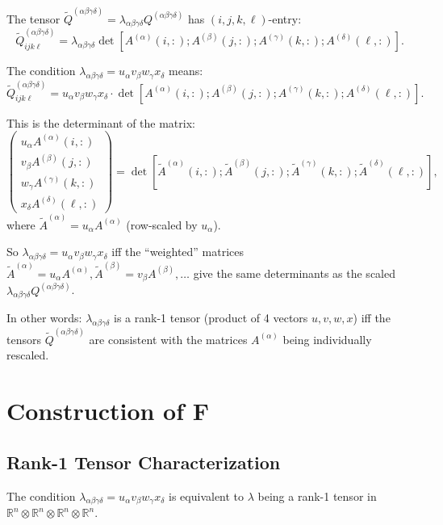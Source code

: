 \documentclass[12pt]{article}
\theoremstyle{definition}
\begin{document}
The tensor $\tilde{Q}^{(\alpha\beta\gamma\delta)} = \lambda_{\alpha\beta\gamma\delta}Q^{(\alpha\beta\gamma\delta)}$ has $(i,j,k,\ell)$-entry:
$$\tilde{Q}^{(\alpha\beta\gamma\delta)}_{ijk\ell} = \lambda_{\alpha\beta\gamma\delta}\det[A^{(\alpha)}(i,:);A^{(\beta)}(j,:);A^{(\gamma)}(k,:);A^{(\delta)}(\ell,:)].$$

The condition $\lambda_{\alpha\beta\gamma\delta} = u_\alpha v_\beta w_\gamma x_\delta$ means:
$$\tilde{Q}^{(\alpha\beta\gamma\delta)}_{ijk\ell} = u_\alpha v_\beta w_\gamma x_\delta\cdot\det[A^{(\alpha)}(i,:);A^{(\beta)}(j,:);A^{(\gamma)}(k,:);A^{(\delta)}(\ell,:)].$$

This is the determinant of the matrix:
$$\begin{pmatrix}u_\alpha A^{(\alpha)}(i,:)\\ v_\beta A^{(\beta)}(j,:)\\ w_\gamma A^{(\gamma)}(k,:)\\ x_\delta A^{(\delta)}(\ell,:)\end{pmatrix} = \det[\tilde{A}^{(\alpha)}(i,:);\tilde{A}^{(\beta)}(j,:);\tilde{A}^{(\gamma)}(k,:);\tilde{A}^{(\delta)}(\ell,:)],$$
where $\tilde{A}^{(\alpha)} = u_\alpha A^{(\alpha)}$ (row-scaled by $u_\alpha$).

So $\lambda_{\alpha\beta\gamma\delta} = u_\alpha v_\beta w_\gamma x_\delta$ iff the ``weighted'' matrices $\tilde{A}^{(\alpha)} = u_\alpha A^{(\alpha)},\tilde{A}^{(\beta)} = v_\beta A^{(\beta)},\ldots$ give the same determinants as the scaled $\lambda_{\alpha\beta\gamma\delta}Q^{(\alpha\beta\gamma\delta)}$.

In other words: $\lambda_{\alpha\beta\gamma\delta}$ is a rank-1 tensor (product of 4 vectors $u,v,w,x$) iff the tensors $\tilde{Q}^{(\alpha\beta\gamma\delta)}$ are consistent with the matrices $A^{(\alpha)}$ being individually rescaled.

\section{Construction of $\mathbf{F}$}

\subsection{Rank-1 Tensor Characterization}

The condition $\lambda_{\alpha\beta\gamma\delta} = u_\alpha v_\beta w_\gamma x_\delta$ is equivalent to $\lambda$ being a rank-1 tensor in $\mathbb{R}^n\otimes\mathbb{R}^n\otimes\mathbb{R}^n\otimes\mathbb{R}^n$.
\end{document}
